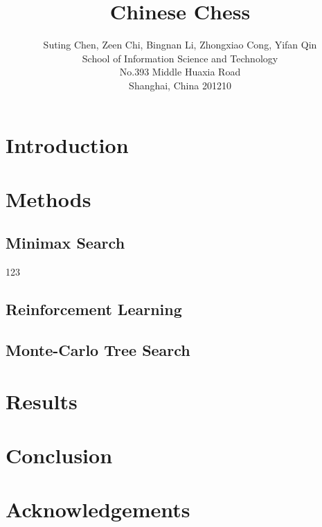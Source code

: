 \documentclass[letterpaper]{article}
\title{Chinese Chess}
\author{Suting Chen, Zeen Chi, Bingnan Li, Zhongxiao Cong, Yifan Qin\\
School of Information Science and Technology\\
No.393 Middle Huaxia Road\\
Shanghai, China 201210\\
}
\begin{document}
\maketitle

\begin{abstract}
\begin{quote}

\end{quote}
\end{abstract}

\section{Introduction}\label{sec:introduction}


\section{Methods}\label{sec:methods}

\subsection{Minimax Search}\label{subsec:minimax-search}
123\cite{yen2004computer}
\subsection{Reinforcement Learning}\label{subsec:reinforcement-learning}

\subsection{Monte-Carlo Tree Search}\label{subsec:monte-carlo-tree-search}


\section{Results}\label{sec:results}


\section{Conclusion}\label{sec:conclusion}


\section{Acknowledgements}\label{sec:acknowledgements}



\end{document}
